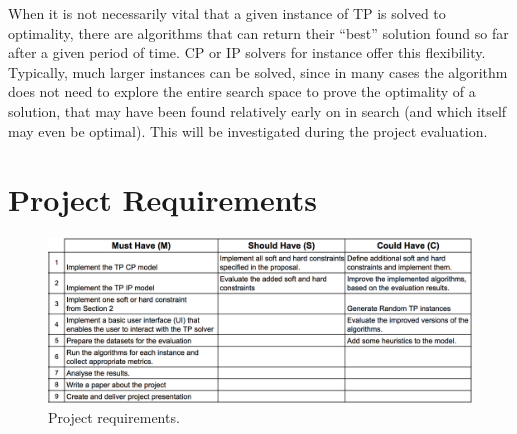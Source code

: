 \documentclass{mprop}
\theoremstyle{definition}
\begin{document}
When it is not necessarily vital that a given instance of TP is solved to optimality, there are algorithms that can return their ``best'' solution found so far after a given period of time. CP or IP solvers for instance offer this flexibility. Typically, much larger instances can be solved, since in many cases the algorithm does not need to explore the entire search space to prove the optimality of a solution, that may have been found relatively early on in search (and which itself may even be optimal). This will be investigated during the project evaluation.



\section{Project Requirements}
\label{sec:requirements}

\begin{figure}
\centering
\includegraphics[width = 16cm, height = 6 cm]{images/requirements.png}
\caption{Project requirements.}
\label{fig:requirements}
\end{figure}
\end{document}

